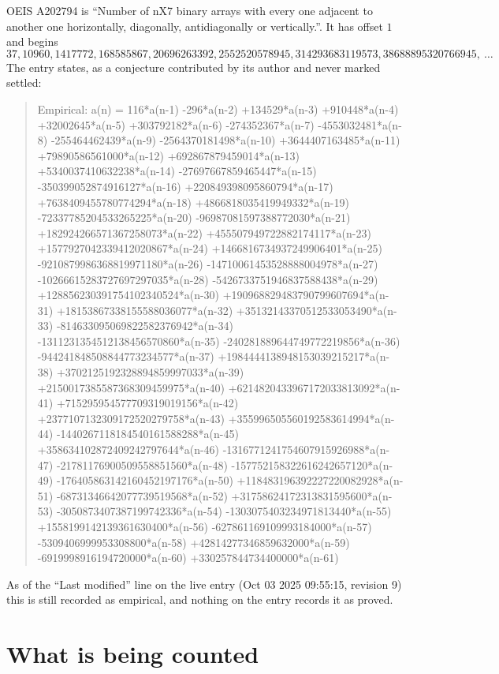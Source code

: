 \documentclass[11pt,a4paper]{article}
\theoremstyle{plain}
\theoremstyle{definition}
\begin{document}
OEIS A202794 is ``Number of nX7 binary arrays with every one adjacent to another one horizontally, diagonally, antidiagonally or vertically.''. It has offset $1$ and begins
\[
37, 10960, 1417772, 168585867, 20696263392, 2552520578945, 314293683119573, 38688895320766945,\ \dots
\]
The entry states, as a conjecture contributed by its author and never marked settled:
\begin{quote}
Empirical: a(n) = 116*a(n-1) -296*a(n-2) +134529*a(n-3) +910448*a(n-4) +32002645*a(n-5) +303792182*a(n-6) -274352367*a(n-7) -4553032481*a(n-8) -255464462439*a(n-9) -2564370181498*a(n-10) +3644407163485*a(n-11) +79890586561000*a(n-12) +692867879459014*a(n-13) +5340037410632238*a(n-14) -27697667859465447*a(n-15) -350399052874916127*a(n-16) +220849398095860794*a(n-17) +7638409455780774294*a(n-18) +4866818035419949332*a(n-19) -72337785204533265225*a(n-20) -96987081597388772030*a(n-21) +182924266571367258073*a(n-22) +455507949722882174117*a(n-23) +1577927042339412020867*a(n-24) +1466816734937249906401*a(n-25) -9210879986368819971180*a(n-26) -14710061453528888004978*a(n-27) -10266615283727697297035*a(n-28) -5426733751946837588438*a(n-29) +128856230391754102340524*a(n-30) +190968829483790799607694*a(n-31) +18153867338155588036077*a(n-32) +35132143370512533053490*a(n-33) -814633095069822582376942*a(n-34) -1311231354512138456570860*a(n-35) -240281889644749772219856*a(n-36) -944241848508844773234577*a(n-37) +1984444138948153039215217*a(n-38) +3702125192328894859997033*a(n-39) +2150017385587368309459975*a(n-40) +6214820433967172033813092*a(n-41) +715295954577709319019156*a(n-42) +2377107132309172520279758*a(n-43) +355996505560192583614994*a(n-44) -1440267118184540161588288*a(n-45) +358634102872409242797644*a(n-46) -1316771241754607915926988*a(n-47) -21781176900509558851560*a(n-48) -157752158322616242657120*a(n-49) -176405863142160452197176*a(n-50) +118483196392227220082928*a(n-51) -68731346642077739519568*a(n-52) +31758624172313831595600*a(n-53) -3050873407387199742336*a(n-54) -1303075403234971813440*a(n-55) +1558199142139361630400*a(n-56) -627861169109993184000*a(n-57) -5309406999953308800*a(n-58) +42814277346859632000*a(n-59) -6919998916194720000*a(n-60) +330257844734400000*a(n-61)
\end{quote}
As of the ``Last modified'' line on the live entry (Oct 03 2025 09:55:15, revision 9) this is still
recorded as empirical, and nothing on the entry records it as proved.

\section{What is being counted}
\end{document}
